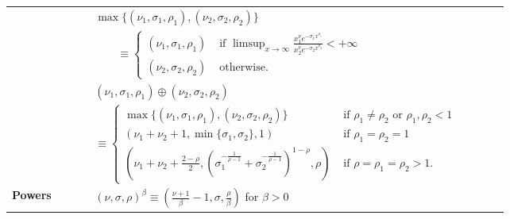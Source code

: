 \documentclass[../thesis.tex]{subfiles}
\begin{document}
\begin{table}[t]
  \centering
  \bgroup
  {\small
    \begin{tabular}{|M{0.15\linewidth} | p{0.75\linewidth}|}
      \hline
      \centering {}        &
      $\max\{(\nu_1,\sigma_1,\rho_1),(\nu_2,\sigma_2,\rho_2)\}$                                                                                                                                                                                                                    \\ & $\qquad \equiv \begin{cases}
          (\nu_1,\sigma_1,\rho_1) & \text{ if } \limsup_{x\to\infty} \frac{x^\nu_1 e^{-\sigma_1 x^{\rho_1}}}{x^\nu_2 e^{-\sigma_2 x^{\rho_2}}} < +\infty \\
          (\nu_2,\sigma_2,\rho_2) & \text{ otherwise.}
        \end{cases}$ \\ \hline
      \centering {}        & $(\nu_{1},\sigma_{1},\rho_{1})\oplus(\nu_{2},\sigma_{2},\rho_{2})$                                                                                                                                                    \\
                                                           & $\equiv \begin{cases}
                                                                         \max\{(\nu_{1},\sigma_{1},\rho_{1}),(\nu_{2},\sigma_{2},\rho_{2})\}                                              & \text{ if }\rho_{1}\neq\rho_{2}\text{ or }\rho_{1},\rho_{2}<1 \\
                                                                         \left(\nu_{1}+\nu_{2}+1,\min\{\sigma_{1},\sigma_{2}\},1\right)                                                   & \text{ if }\rho_{1}=\rho_{2}=1                                \\
                                                                         (\nu_{1}+\nu_{2}+\frac{2-\rho}{2},(\sigma_{1}^{-\frac{1}{\rho-1}}+\sigma_{2}^{-\frac{1}{\rho-1}})^{1-\rho},\rho) & \text{ if }\rho=\rho_{1}=\rho_{2}>1.
                                                                       \end{cases}$
      \\ \hline
      \centering \textbf{Powers}                           & $(\nu,\sigma,\rho)^\beta \equiv (\frac{\nu+1}{\beta} - 1,\sigma,\frac{\rho}{\beta})$ for $\beta > 0$                                                                                                                  \\\hline

\end{tabular}}
\end{table}
\end{document}
